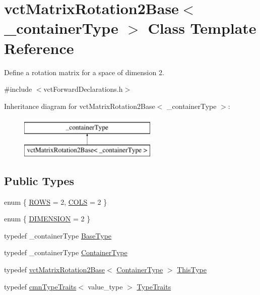 \hypertarget{classvct_matrix_rotation2_base}{}\section{vct\+Matrix\+Rotation2\+Base$<$ \+\_\+container\+Type $>$ Class Template Reference}
\label{classvct_matrix_rotation2_base}


Define a rotation matrix for a space of dimension 2.  




{\ttfamily \#include $<$vct\+Forward\+Declarations.\+h$>$}

Inheritance diagram for vct\+Matrix\+Rotation2\+Base$<$ \+\_\+container\+Type $>$\+:\begin{figure}[H]
\begin{center}
\leavevmode
\includegraphics[height=2.000000cm]{d2/dcd/classvct_matrix_rotation2_base}
\end{center}
\end{figure}
\subsection*{Public Types}
\begin{DoxyCompactItemize}
\item 
enum \{ \hyperlink{classvct_matrix_rotation2_base_aee21d1136c8b273c716774ceb24ea31bad80015187d3670804554f4bd9cec3822}{R\+O\+W\+S} = 2, 
\hyperlink{classvct_matrix_rotation2_base_aee21d1136c8b273c716774ceb24ea31babf5d0d692c30b7a19cc0c63d2bcc2113}{C\+O\+L\+S} = 2
 \}
\item 
enum \{ \hyperlink{classvct_matrix_rotation2_base_ac10279ed12ec787b1a4833ea02771348acefb9855f54f0cfd782e785c9083e592}{D\+I\+M\+E\+N\+S\+I\+O\+N} = 2
 \}
\item 
typedef \+\_\+container\+Type \hyperlink{classvct_matrix_rotation2_base_a3ce93aa444c1fadbc26ed0d5582ad33a}{Base\+Type}
\item 
typedef \+\_\+container\+Type \hyperlink{classvct_matrix_rotation2_base_ace2b6ba4773b1688b757cec782686180}{Container\+Type}
\item 
typedef \hyperlink{classvct_matrix_rotation2_base}{vct\+Matrix\+Rotation2\+Base}$<$ \hyperlink{classvct_matrix_rotation2_base_ace2b6ba4773b1688b757cec782686180}{Container\+Type} $>$ \hyperlink{classvct_matrix_rotation2_base_a47ffeef2ddecede4b16bcc88fb432ff5}{This\+Type}
\item 
typedef \hyperlink{classcmn_type_traits}{cmn\+Type\+Traits}$<$ value\+\_\+type $>$ \hyperlink{classvct_matrix_rotation2_base_abd9a728263fc154b76fecac0d9c19c4d}{Type\+Traits}
\end{DoxyCompactItemize}
